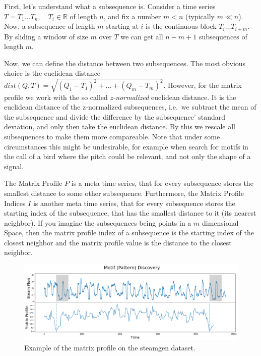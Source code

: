 \documentclass[12pt,a4paper]{article}
\begin{document}
First, let's understand what a subsequence is. Consider a time series
\(T=T_1 \dots T_n,\quad T_i\in\mathbb{R}\) of length \(n\), and fix a
number \(m < n\) (typically \(m \ll n\)). Now, a subsequence of length
\(m\) starting at \(i\) is the continuous block \(T_i \dots T_{i+m}\).
By sliding a window of size \(m\) over \(T\) we can get all \(n-m+1\)
subsequences of length \(m\).

Now, we can define the distance between two subsequences. The most
obvious choice is the euclidean distance
\(dist(Q, T) = \sqrt{\left(Q_1 - T_1\right)^2+\dots+\left(Q_m-T_m\right)^2}\).
However, for the matrix profile we work with the so called
\emph{z-normalized} euclidean distance. It is the euclidean distance of
the z-normalized subsequences, i.e.~we subtract the mean of the
subsequence and divide the difference by the subsequence' standard
deviation, and only then take the euclidean distance. By this we rescale
all subsequences to make them more compareable. Note that under some
circumstances this might be undesirable, for example when search for
motifs in the call of a bird where the pitch could be relevant, and not
only the shape of a signal.

The Matrix Profile \(P\) is a meta time series, that for every
subsequence stores the smallest distance to some other subsequence.
Furthermore, the Matrix Profile Indices \(I\) is another meta time
series, that for every subsequence stores the starting index of the
subsequence, that has the smallest distance to it (its nearest
neighbor). If you imagine the subsequences being points in a \(m\)
dimensional Space, then the matrix profile index of a subsequence is the
starting index of the closest neighbor and the matrix profile value is
the distance to the closest neighbor.

\begin{figure}
\centering
\includegraphics{images/MP_example.png}
\caption{Example of the matrix profile on the steamgen dataset.}
\end{figure}
\end{document}
